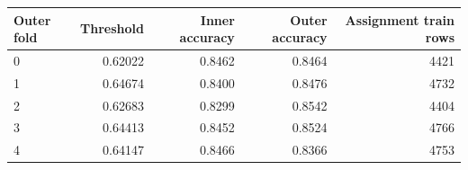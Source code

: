\begin{tabular}{lrrrr}
\toprule
Outer fold & Threshold & Inner accuracy & Outer accuracy & Assignment train rows \\
\midrule
0 & 0.62022 & 0.8462 & 0.8464 & 4421 \\
1 & 0.64674 & 0.8400 & 0.8476 & 4732 \\
2 & 0.62683 & 0.8299 & 0.8542 & 4404 \\
3 & 0.64413 & 0.8452 & 0.8524 & 4766 \\
4 & 0.64147 & 0.8466 & 0.8366 & 4753 \\
\bottomrule
\end{tabular}
\par\medskip
